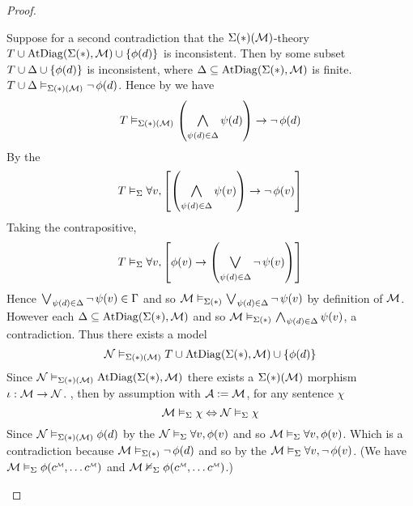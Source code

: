 \begin{proof}
\begin{backward}
        Suppose for a second contradiction that the $\Sigma(*)(\mathcal{M})$-theory
        $T \cup \mathrm{AtDiag}(\Sigma(*),\mathcal{M}) \cup \left\{\phi(d)\right\}$ is inconsistent.
        Then by  
        some subset
        $T \cup \Delta \cup \left\{\phi(d)\right\}$ is inconsistent, 
        where $\Delta \subseteq \mathrm{AtDiag}(\Sigma(*),\mathcal{M})$ is finite.
            $T \cup \Delta \vDash_{\Sigma(*)(\mathcal{M})} \neg\, \phi(d)$.
        Hence by  we have 
        \[T \model{\Si(*)(\MM)} 
            \brkt{\bigand{\psi(d) \in \De}{} \psi(d)} \to \NOT \phi(d)\]
        By the 
        \[T \model{\Si} 
            \forall v, 
            \sqbrkt{\brkt{\bigand{\psi(d) \in \De}{}\psi(v)} 
            \to \NOT \phi(v)}\]
        Taking the contrapositive, 
        \[T \model{\Si} 
            \forall v, 
            \sqbrkt{\phi(v) 
            \to \brkt{\bigor{\psi(d) \in \De}{}\NOT \psi(v)}}\]
        Hence $\bigor{\psi(d) \in \De}{}\NOT \psi(v) \in \Ga$
        and so $\MM \model{\Si(*)} \bigor{\psi(d) \in \De}{}\NOT \psi(v)$
        by definition of $\mathcal{M}$.
        However each $\Delta \subseteq \mathrm{AtDiag}(\Sigma(*),\mathcal{M})$ and so
        $\MM \model{\Si(*)} \bigand{\psi(d) \in \De}{}\psi(v)$, 
        a contradiction.
        Thus there exists a model
        \[\mathcal{N} \vDash_{\Sigma(*)(\mathcal{M})} T \cup 
            \mathrm{AtDiag}(\Sigma(*),\mathcal{M}) \cup \left\{\phi(d)\right\}\]
        Since $\mathcal{N} \vDash_{\Sigma(*)(\mathcal{M})} \mathrm{AtDiag}(\Sigma(*),\mathcal{M})$ there exists a 
        $\Sigma(*)(\mathcal{M})$ morphism $\iota : \mathcal{M} \to \mathcal{N}$.
        , then
        by assumption with $\mathcal{A} := \mathcal{M}$, for any sentence $\chi$
        \[\mathcal{M} \vDash_{\Sigma} \chi
            \Leftrightarrow \mathcal{N} \vDash_{\Sigma} \chi\]
        Since $\mathcal{N} \vDash_{\Sigma(*)(\mathcal{M})} \phi(d)$ by the 
        $\mathcal{N} \vDash_{\Sigma} \forall v, \phi(v)$
        and so $\mathcal{M} \vDash_{\Sigma} \forall v, \phi(v)$.
        Which is a contradiction because
        $\mathcal{M} \vDash_{\Sigma(*)} \neg\, \phi(d)$ and so 
        by the  
        $\mathcal{M} \vDash_{\Sigma} \forall v, \neg\, \phi(v)$.
        (We have
        $\MM \model{\Si} \phi(\modintp{\MM}{c}, \dots \modintp{\MM}{c})$
        and $\MM \nodel{\Si} \phi(\modintp{\MM}{c}, \dots \modintp{\MM}{c})$.)
    \end{backward}
\end{proof}

